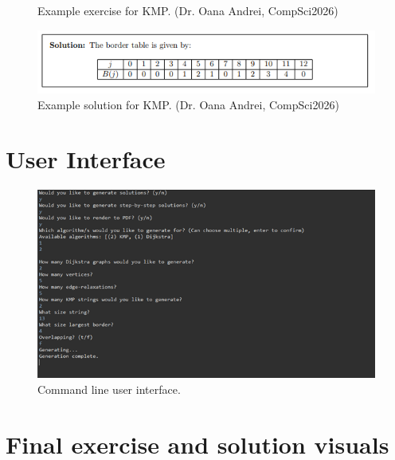 \documentclass{l4proj}
\begin{document}
\begin{appendices}
\begin{figure}[h]
    \caption{Example exercise for KMP. (Dr. Oana Andrei, CompSci2026)}
    \label{fig:kmp_example_exercise} 
\end{figure}

\begin{figure}[h]
    \centering
    \includegraphics[width=0.9\linewidth]{images/kmp_example_solution}    

    \caption{Example solution for KMP. (Dr. Oana Andrei, CompSci2026)}
    \label{fig:kmp_example_solution} 
\end{figure}

\chapter{User Interface}
\label{chap:user_interface}

\begin{figure}[h]
    \centering
    \includegraphics[width=0.99\linewidth]{images/user_interface}    

    \caption{Command line user interface.}
    \label{fig:user_interface} 
\end{figure}

\chapter{Final exercise and solution visuals}
\label{chap:visuals}







\end{appendices}
\end{document}
